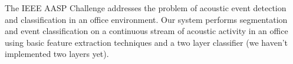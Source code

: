 The IEEE AASP Challenge addresses the problem of acoustic event detection and classification in an office environment. Our system performs segmentation and event classification on a continuous stream of acoustic activity in an office using basic feature extraction techniques and a two layer classifier (we haven't implemented two layers yet).

